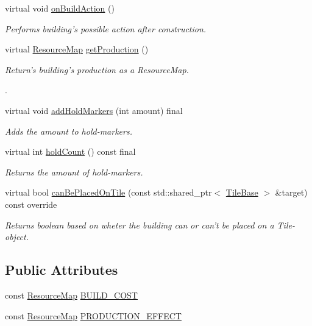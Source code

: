 \begin{DoxyCompactItemize}
virtual void \hyperlink{classCourse_1_1BuildingBase_a2e3a5ad53afb74fdf030a5679e40a341}{on\-Build\-Action} ()
\begin{DoxyCompactList}\small\item\em Performs building's possible action after construction. \end{DoxyCompactList}\item 
virtual \hyperlink{namespaceCourse_ab9a46ed9cd00485e318e5731ea2f78d9}{Resource\-Map} \hyperlink{classCourse_1_1BuildingBase_ad53ecc1dea91e3ca51c31759fe1680cb}{get\-Production} ()
\begin{DoxyCompactList}\small\item\em Return's building's production as a Resource\-Map.\par
. \end{DoxyCompactList}\item 
virtual void \hyperlink{classCourse_1_1BuildingBase_aaa5fb119b7a1873744b83900b3ce04d2}{add\-Hold\-Markers} (int amount) final
\begin{DoxyCompactList}\small\item\em Adds the amount to hold-\/markers. \end{DoxyCompactList}\item 
virtual int \hyperlink{classCourse_1_1BuildingBase_afa4f0dd0fdfaf9b600d10fe477080cf6}{hold\-Count} () const final
\begin{DoxyCompactList}\small\item\em Returns the amount of hold-\/markers. \end{DoxyCompactList}\item 
virtual bool \hyperlink{classCourse_1_1BuildingBase_add23c593f509f39654f2d5abc7d8c072}{can\-Be\-Placed\-On\-Tile} (const std\-::shared\-\_\-ptr$<$ \hyperlink{classCourse_1_1TileBase}{Tile\-Base} $>$ \&target) const override
\begin{DoxyCompactList}\small\item\em Returns boolean based on wheter the building can or can't be placed on a Tile-\/object. \end{DoxyCompactList}\end{DoxyCompactItemize}
\subsection*{Public Attributes}
\begin{DoxyCompactItemize}
\item 
const \hyperlink{namespaceCourse_ab9a46ed9cd00485e318e5731ea2f78d9}{Resource\-Map} \hyperlink{classCourse_1_1BuildingBase_ab63e067ebb226173d7b281c70b6e58bf}{B\-U\-I\-L\-D\-\_\-\-C\-O\-S\-T}
\item 
const \hyperlink{namespaceCourse_ab9a46ed9cd00485e318e5731ea2f78d9}{Resource\-Map} \hyperlink{classCourse_1_1BuildingBase_a69fc58a02c5299f408f35ef02a604633}{P\-R\-O\-D\-U\-C\-T\-I\-O\-N\-\_\-\-E\-F\-F\-E\-C\-T}
\end{DoxyCompactItemize}
